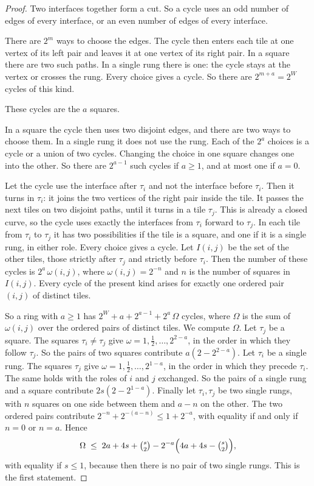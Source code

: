 \begin{proof}
Two interfaces together form a cut. So a cycle uses an odd number of edges of every interface, or
an even number of edges of every interface.

 There are $2^{m}$ ways to choose the edges. The cycle then
enters each tile at one vertex of its left pair and leaves it at one vertex of its right pair. In a
square there are two such paths. In a single rung there is one: the cycle stays at the vertex or
crosses the rung. Every choice gives a cycle. So there are $2^{m+a}=2^{W}$ cycles of this kind.

 These cycles are the $a$ squares.

 In a square the cycle then uses two disjoint edges, and there
are two ways to choose them. In a single rung it does not use the rung. Each of the $2^{a}$ choices
is a cycle or a union of two cycles. Changing the choice in one square changes one into the other.
So there are $2^{a-1}$ such cycles if $a\ge1$, and at most one if $a=0$.

 Let the cycle use the interface after
$\tau_i$ and not the interface before $\tau_i$. Then it turns in $\tau_i$: it joins the two
vertices of the right pair inside the tile. It passes the next tiles on two disjoint paths, until
it turns in a tile $\tau_j$. This is already a closed curve, so the cycle uses exactly the
interfaces from $\tau_i$ forward to $\tau_j$. In each tile from $\tau_i$ to $\tau_j$ it has two
possibilities if the tile is a square, and one if it is a single rung, in either role. Every
choice gives a cycle. Let $I(i,j)$ be the set of the other tiles, those strictly after $\tau_j$
and strictly before $\tau_i$. Then the number of these cycles is $2^{a}\,\omega(i,j)$, where
$\omega(i,j)=2^{-n}$ and $n$ is the number of squares in $I(i,j)$. Every cycle of the present kind
arises for exactly one ordered pair $(i,j)$ of distinct tiles.

So a ring with $a\ge1$ has $2^{W}+a+2^{a-1}+2^{a}\,\Omega$ cycles, where $\Omega$ is the sum of
$\omega(i,j)$ over the ordered pairs of distinct tiles. We compute $\Omega$. Let $\tau_j$ be a
square. The squares $\tau_i\ne\tau_j$ give $\omega=1,\frac12,\dots,2^{2-a}$, in the order in which
they follow $\tau_j$. So the pairs of two squares contribute $a(2-2^{2-a})$. Let $\tau_i$ be a
single rung. The squares $\tau_j$ give $\omega=1,\frac12,\dots,2^{1-a}$, in the order in which they
precede $\tau_i$. The same holds with the roles of $i$ and $j$ exchanged. So the pairs of a single
rung and a square contribute $2s(2-2^{1-a})$. Finally let $\tau_i,\tau_j$ be two single rungs, with
$n$ squares on one side between them and $a-n$ on the other. The two ordered pairs contribute
$2^{-n}+2^{-(a-n)}\le1+2^{-a}$, with equality if and only if $n=0$ or $n=a$. Hence
\[
  \Omega\;\le\;2a+4s+\tbinom s2-2^{-a}\Bigl(4a+4s-\tbinom s2\Bigr),
\]
with equality if $s\le1$, because then there is no pair of two single rungs. This is the first
statement.


\end{proof}
